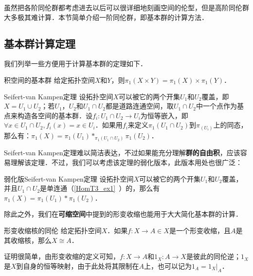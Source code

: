 

虽然把各阶同伦群都考虑进去以后可以很详细地刻画空间的伦型，但是高阶同伦群大多极其难计算．本节简单介绍一阶同伦群，即基本群的计算方法．

\subsection{基本群计算定理}

我们列举一些方便用于计算基本群的定理如下．

\begin{theorem}{积空间的基本群}
给定拓扑空间$X$和$Y$，则$\pi_1(X\times Y)=\pi_1(X)\times\pi_1(Y)$．
\end{theorem}

\begin{theorem}{Seifert-van Kampen定理}
设拓扑空间$X$可以被它的两个开集$U_1$和$U_2$覆盖，即$X=U_1\cup U_2$；若$U_1$，$U_2$和$U_1\cap U_2$都是道路连通空间，取$U_1\cap U_2$中一个点作为基点来构造各空间的基本群．设$f_i:U_1\cap U_2\rightarrow U_i$为恒等嵌入，即$\forall x\in U_1\cap U_2, f_i(x)=x\in U_i$．如果用$f_i$来定义$\pi_1(U_1\cap U_2)$到$\pi_(U_i)$上的同态，那么有：$\pi_1(X)=\pi_1(U_1)*_{\pi_1(U_1\cap U_2)}\pi_1(U_2)$．
\end{theorem}

Seifert-van Kampen定理难以简洁表达，不过如果能充分理解\textbf{群的自由积}，应该容易理解该定理．不过，我们可以考虑该定理的弱化版本，此版本用处也很广泛：

\begin{theorem}{弱化版Seifert-van Kampen定理}
设拓扑空间$X$可以被它的两个开集$U_1$和$U_2$覆盖，并且$U_1\cap U_2$是单连通（\autoref{HomT3_ex1}~）的，那么有$\pi_1(X)=\pi_1(U_1)*\pi_1(U_2)$．
\end{theorem}

除此之外，我们在\textbf{可缩空间}中提到的形变收缩也能用于大大简化基本群的计算．

\begin{theorem}{形变收缩核的同伦}\label{HomT5_the1}
给定拓扑空间$X$．如果$f:X\rightarrow A\in X$是一个形变收缩，且$A$是其收缩核，那么$X\cong A$．
\end{theorem}

证明很简单，由形变收缩的定义可知，$f:X\rightarrow A$和$1_X:A\rightarrow X$是彼此的同伦逆；$1_X$是$X$到自身的恒等映射，由于此处将其限制在$A$上，也可以记为$1_A=1_X|_A$．


